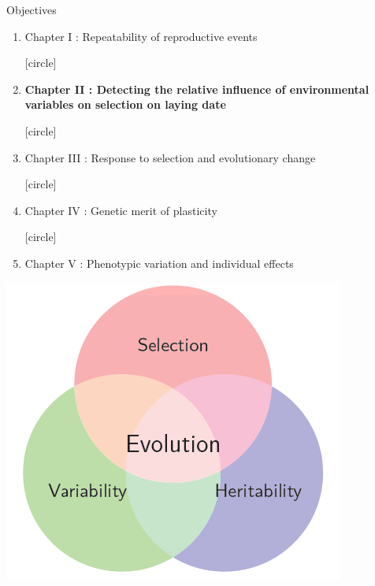 \documentclass[compress]{beamer}
\begin{document}
%
\begin{frame}{Objectives}
   \begin{enumerate}
  [circle]
\item \normalsize Chapter I : Repeatability of reproductive events
\vspace{0.3cm}

  [circle]
\item \normalsize \textbf{Chapter II : Detecting the relative influence of environmental variables on selection on laying date}  
\vspace{0.3cm}

  [circle]
\item \normalsize Chapter III : Response to selection and evolutionary change
\vspace{0.3cm}

  [circle]
\item \normalsize Chapter IV : Genetic merit of plasticity 
\vspace{0.3cm}

  [circle]
\item \normalsize Chapter V : Phenotypic variation and individual effects
\end{enumerate}

\vspace{0.5cm}
\centering
  \includegraphics[height = 3.5 cm]{Image/evolution.png} 

\end{frame}
\end{document}
